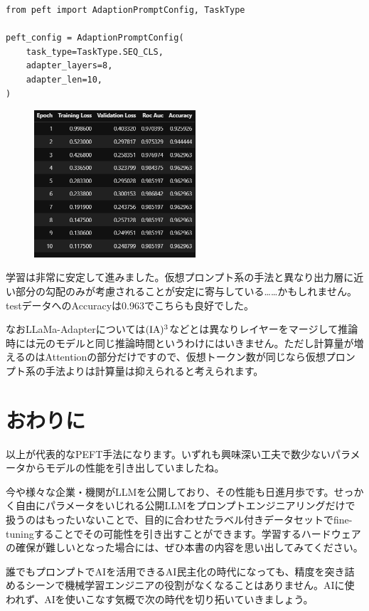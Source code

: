 \documentclass[a5paper,twoside,dvipdfmx]{jsarticle}
\begin{document}
\begin{lstlisting}
from peft import AdaptionPromptConfig, TaskType

peft_config = AdaptionPromptConfig(
    task_type=TaskType.SEQ_CLS,
    adapter_layers=8,
    adapter_len=10,
)
\end{lstlisting}



\begin{figure}[h]
  \centering
  \includegraphics[width=60mm]{../C105Fig/gray/llama_adapter_train.png}
 \end{figure} 

学習は非常に安定して進みました。仮想プロンプト系の手法と異なり出力層に近い部分の勾配のみが考慮されることが安定に寄与している……かもしれません。testデータへのAccuracyは0.963でこちらも良好でした。

なおLLaMa-Adapterについては$\rm{(IA)^3}$などとは異なりレイヤーをマージして推論時には元のモデルと同じ推論時間というわけにはいきません。ただし計算量が増えるのはAttentionの部分だけですので、仮想トークン数が同じなら仮想プロンプト系の手法よりは計算量は抑えられると考えられます。

\newpage

\section{おわりに}

以上が代表的なPEFT手法になります。いずれも興味深い工夫で数少ないパラメータからモデルの性能を引き出していましたね。

今や様々な企業・機関がLLMを公開しており、その性能も日進月歩です。せっかく自由にパラメータをいじれる公開LLMをプロンプトエンジニアリングだけで扱うのはもったいないことで、目的に合わせたラベル付きデータセットでfine-tuningすることでその可能性を引き出すことができます。学習するハードウェアの確保が難しいとなった場合には、ぜひ本書の内容を思い出してみてください。

誰でもプロンプトでAIを活用できるAI民主化の時代になっても、精度を突き詰めるシーンで機械学習エンジニアの役割がなくなることはありません。AIに使われず、AIを使いこなす気概で次の時代を切り拓いていきましょう。
\end{document}
